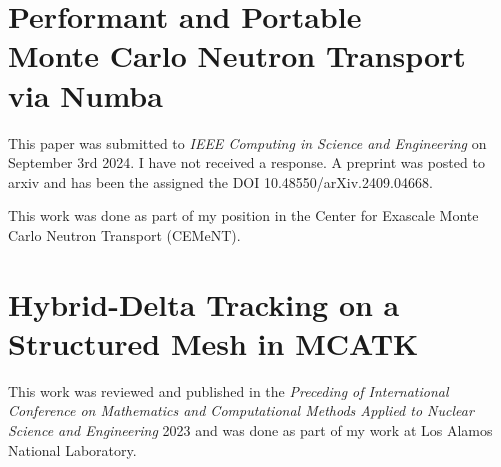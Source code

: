 \section{Performant and Portable\\ Monte Carlo Neutron Transport via Numba}
\label{app:cise}

This paper was submitted to \textit{IEEE Computing in Science and Engineering} on September 3rd 2024. 
I have not received a response.
A preprint was posted to arxiv and has been the assigned the DOI 10.48550/arXiv.2409.04668.

This work was done as part of my position in the Center for Exascale Monte Carlo Neutron Transport (CEMeNT).






\section{Hybrid-Delta Tracking on a Structured Mesh in MCATK}

This work was reviewed and published in the \textit{Preceding of International Conference on Mathematics and Computational Methods Applied to Nuclear Science and Engineering} 2023 and was done as part of my work at Los Alamos National Laboratory.


